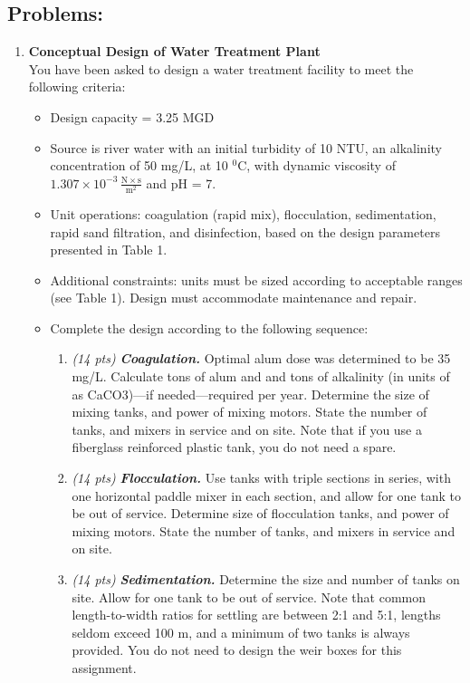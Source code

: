 \documentclass[11pt,letterpaper]{article}
\begin{document}
\subsection *{Problems:}
\begin{enumerate}

\item \textbf{Conceptual Design of Water Treatment Plant}\\


You have been asked to design a water treatment facility to meet the following criteria:

\begin{itemize}
\item Design capacity = 3.25 MGD
\item Source is river water with an initial turbidity of 10 NTU, an alkalinity concentration of 50 mg/L, at 10 $^0$C, with dynamic viscosity of $\mathrm{1.307 \times 10^{-3}\, \frac{N\times s}{m^2}}$ and pH = 7.
\item Unit operations: coagulation (rapid mix), flocculation, sedimentation, rapid sand filtration, and disinfection, based on the design parameters presented in Table 1.
\item Additional constraints: units must be sized according to acceptable ranges (see Table 1).  Design must accommodate maintenance and repair.
\item Complete the design according to the following sequence:
\vspace{0.2in}

\begin{enumerate}
\item \emph{(14 pts)} \emph{\textbf{Coagulation.}}  Optimal alum dose was determined to be 35 mg/L.  Calculate tons of alum and and tons of alkalinity (in units of as CaCO3)---if needed---required per year. Determine the size of mixing tanks, and power of mixing motors.  State the number of tanks, and mixers in service and on site.  Note that if you use a fiberglass reinforced plastic tank, you do not need a spare.

\item \emph{(14 pts)} \emph{\textbf{Flocculation.}}   Use tanks with triple sections in series, with one horizontal paddle mixer in each section, and allow for one tank to be out of service. Determine size of flocculation tanks, and power of mixing motors.  State the number of tanks, and mixers in service and on site. 

\item \emph{(14 pts)} \emph{\textbf{Sedimentation.}}  Determine the size and number of tanks on site.  Allow for one tank to be out of service.  Note that common length-to-width ratios for settling are between 2:1 and 5:1, lengths seldom exceed 100 m, and a minimum of two tanks is always provided.  You do not need to design the weir boxes for this assignment.


\end{enumerate}
\end{itemize}
\end{enumerate}
\end{document}
